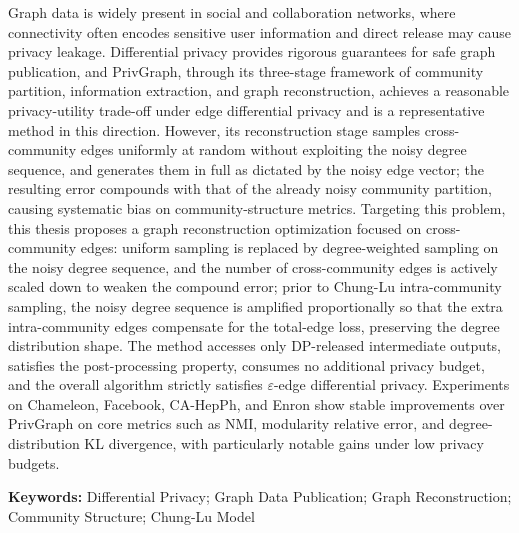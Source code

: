 \par Graph data is widely present in social and collaboration networks, where connectivity often encodes sensitive user information and direct release may cause privacy leakage. Differential privacy provides rigorous guarantees for safe graph publication, and PrivGraph, through its three-stage framework of community partition, information extraction, and graph reconstruction, achieves a reasonable privacy-utility trade-off under edge differential privacy and is a representative method in this direction. However, its reconstruction stage samples cross-community edges uniformly at random without exploiting the noisy degree sequence, and generates them in full as dictated by the noisy edge vector; the resulting error compounds with that of the already noisy community partition, causing systematic bias on community-structure metrics. Targeting this problem, this thesis proposes a graph reconstruction optimization focused on cross-community edges: uniform sampling is replaced by degree-weighted sampling on the noisy degree sequence, and the number of cross-community edges is actively scaled down to weaken the compound error; prior to Chung-Lu intra-community sampling, the noisy degree sequence is amplified proportionally so that the extra intra-community edges compensate for the total-edge loss, preserving the degree distribution shape. The method accesses only DP-released intermediate outputs, satisfies the post-processing property, consumes no additional privacy budget, and the overall algorithm strictly satisfies $\varepsilon$-edge differential privacy. Experiments on Chameleon, Facebook, CA-HepPh, and Enron show stable improvements over PrivGraph on core metrics such as NMI, modularity relative error, and degree-distribution KL divergence, with particularly notable gains under low privacy budgets.

\textbf{Keywords:} Differential Privacy; Graph Data Publication; Graph Reconstruction; Community Structure; Chung-Lu Model